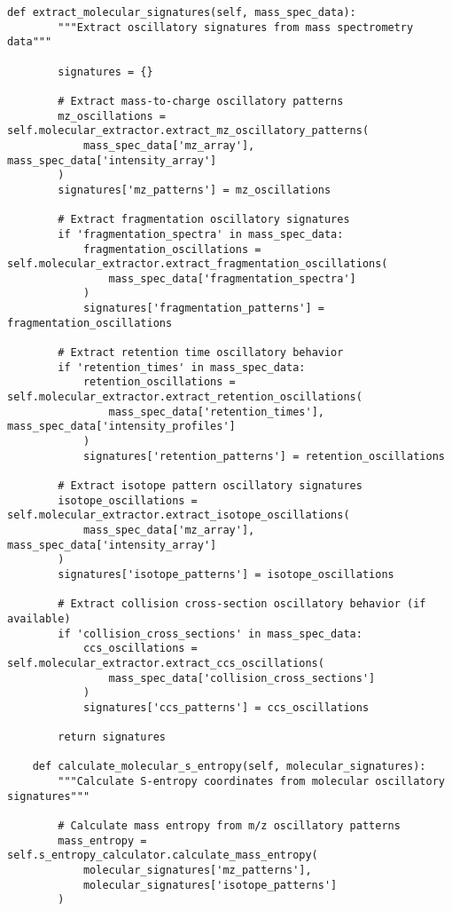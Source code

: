 \documentclass[12pt,a4paper]{article}
\begin{document}
\begin{lstlisting}[style=pythonstyle, caption=Core Ion-to-Drip Implementation for Mass Spectrometry]
    def extract_molecular_signatures(self, mass_spec_data):
        """Extract oscillatory signatures from mass spectrometry data"""
        
        signatures = {}
        
        # Extract mass-to-charge oscillatory patterns
        mz_oscillations = self.molecular_extractor.extract_mz_oscillatory_patterns(
            mass_spec_data['mz_array'], mass_spec_data['intensity_array']
        )
        signatures['mz_patterns'] = mz_oscillations
        
        # Extract fragmentation oscillatory signatures
        if 'fragmentation_spectra' in mass_spec_data:
            fragmentation_oscillations = self.molecular_extractor.extract_fragmentation_oscillations(
                mass_spec_data['fragmentation_spectra']
            )
            signatures['fragmentation_patterns'] = fragmentation_oscillations
        
        # Extract retention time oscillatory behavior
        if 'retention_times' in mass_spec_data:
            retention_oscillations = self.molecular_extractor.extract_retention_oscillations(
                mass_spec_data['retention_times'], mass_spec_data['intensity_profiles']
            )
            signatures['retention_patterns'] = retention_oscillations
        
        # Extract isotope pattern oscillatory signatures
        isotope_oscillations = self.molecular_extractor.extract_isotope_oscillations(
            mass_spec_data['mz_array'], mass_spec_data['intensity_array']
        )
        signatures['isotope_patterns'] = isotope_oscillations
        
        # Extract collision cross-section oscillatory behavior (if available)
        if 'collision_cross_sections' in mass_spec_data:
            ccs_oscillations = self.molecular_extractor.extract_ccs_oscillations(
                mass_spec_data['collision_cross_sections']
            )
            signatures['ccs_patterns'] = ccs_oscillations
        
        return signatures
    
    def calculate_molecular_s_entropy(self, molecular_signatures):
        """Calculate S-entropy coordinates from molecular oscillatory signatures"""
        
        # Calculate mass entropy from m/z oscillatory patterns
        mass_entropy = self.s_entropy_calculator.calculate_mass_entropy(
            molecular_signatures['mz_patterns'], 
            molecular_signatures['isotope_patterns']
        )
        

\end{lstlisting}
\end{document}
